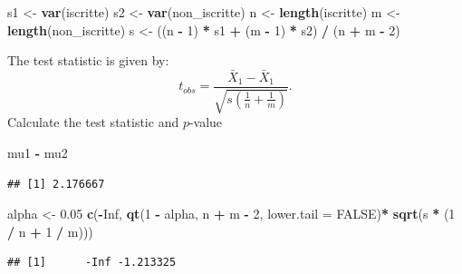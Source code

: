 \documentclass[
]{article}
\newenvironment{Shaded}{\begin{snugshade}}{\end{snugshade}}
\newcommand{\AttributeTok}[1]{\textcolor[rgb]{0.13,0.29,0.53}{#1}}
\newcommand{\ConstantTok}[1]{\textcolor[rgb]{0.56,0.35,0.01}{#1}}
\newcommand{\DecValTok}[1]{\textcolor[rgb]{0.00,0.00,0.81}{#1}}
\newcommand{\FloatTok}[1]{\textcolor[rgb]{0.00,0.00,0.81}{#1}}
\newcommand{\FunctionTok}[1]{\textcolor[rgb]{0.13,0.29,0.53}{\textbf{#1}}}
\newcommand{\NormalTok}[1]{#1}
\newcommand{\OtherTok}[1]{\textcolor[rgb]{0.56,0.35,0.01}{#1}}
\newcommand{\SpecialCharTok}[1]{\textcolor[rgb]{0.81,0.36,0.00}{\textbf{#1}}}
\begin{document}
\begin{Shaded}
\begin{Highlighting}[]
\NormalTok{s1 }\OtherTok{\textless{}{-}} \FunctionTok{var}\NormalTok{(iscritte)}
\NormalTok{s2 }\OtherTok{\textless{}{-}} \FunctionTok{var}\NormalTok{(non\_iscritte)}
\NormalTok{n }\OtherTok{\textless{}{-}} \FunctionTok{length}\NormalTok{(iscritte)}
\NormalTok{m }\OtherTok{\textless{}{-}} \FunctionTok{length}\NormalTok{(non\_iscritte)}
\NormalTok{s }\OtherTok{\textless{}{-}}\NormalTok{ ((n }\SpecialCharTok{{-}} \DecValTok{1}\NormalTok{) }\SpecialCharTok{*}\NormalTok{ s1 }\SpecialCharTok{+}\NormalTok{ (m }\SpecialCharTok{{-}} \DecValTok{1}\NormalTok{) }\SpecialCharTok{*}\NormalTok{ s2) }\SpecialCharTok{/}\NormalTok{ (n }\SpecialCharTok{+}\NormalTok{ m }\SpecialCharTok{{-}} \DecValTok{2}\NormalTok{)}
\end{Highlighting}
\end{Shaded}

The test statistic is given by:
\[t_{obs} = \frac{\bar{X}_1 - \bar{X}_1}{\sqrt{s(\frac{1}{n}+\frac{1}{m})}}.\]
Calculate the test statistic and \(p\)-value

\begin{Shaded}
\begin{Highlighting}[]
\NormalTok{mu1 }\SpecialCharTok{{-}}\NormalTok{ mu2}
\end{Highlighting}
\end{Shaded}

\begin{verbatim}
## [1] 2.176667
\end{verbatim}

\begin{Shaded}
\begin{Highlighting}[]
\NormalTok{alpha }\OtherTok{\textless{}{-}} \FloatTok{0.05}
\FunctionTok{c}\NormalTok{(}\SpecialCharTok{{-}}\ConstantTok{Inf}\NormalTok{, }\FunctionTok{qt}\NormalTok{(}\DecValTok{1} \SpecialCharTok{{-}}\NormalTok{ alpha, n }\SpecialCharTok{+}\NormalTok{ m }\SpecialCharTok{{-}} \DecValTok{2}\NormalTok{, }\AttributeTok{lower.tail =} \ConstantTok{FALSE}\NormalTok{)}\SpecialCharTok{*} \FunctionTok{sqrt}\NormalTok{(s }\SpecialCharTok{*}\NormalTok{ (}\DecValTok{1} \SpecialCharTok{/}\NormalTok{ n }\SpecialCharTok{+} \DecValTok{1} \SpecialCharTok{/}\NormalTok{ m)))}
\end{Highlighting}
\end{Shaded}

\begin{verbatim}
## [1]      -Inf -1.213325
\end{verbatim}
\end{document}

